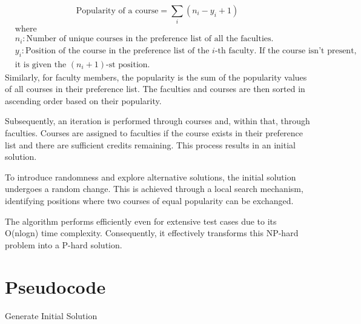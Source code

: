 \documentclass{article}
\begin{document}
\begin{equation}
\text{Popularity of a course} = \sum_{i} (n_i - y_i + 1)
\end{equation}
\begin{align*}
&\text{where} \\
&n_i : \text{Number of unique courses in the preference list of all the faculties.} \\
&y_i : \text{Position of the course in the preference list of the } i\text{-th faculty. If the course isn't present,} \\
&\text{it is given the } (n_i + 1)\text{-st position.}
\end{align*}
Similarly, for faculty members, the popularity is the sum of the popularity values of all courses in their preference list. The faculties and courses are then sorted in ascending order based on their popularity.

Subsequently, an iteration is performed through courses and, within that, through faculties. Courses are assigned to faculties if the course exists in their preference list and there are sufficient credits remaining. This process results in an initial solution.

To introduce randomness and explore alternative solutions, the initial solution undergoes a random change. This is achieved through a local search mechanism, identifying positions where two courses of equal popularity can be exchanged.


The algorithm performs efficiently even for extensive test cases due to its O(nlogn) time complexity. Consequently, it effectively transforms this NP-hard problem into a P-hard solution.

\newpage
{}
\section{Pseudocode}
\begin{algorithm}
\caption{Generate Initial Solution}
\end{algorithm}
{}
\end{document}
